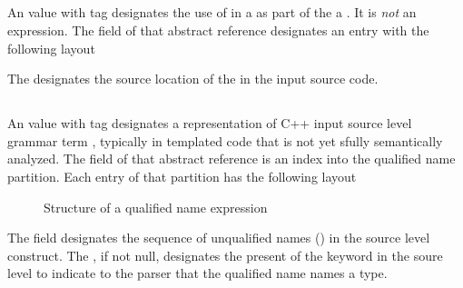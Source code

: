 


\subsection{}
\label{sec:ifc:ExprSort:Pointer}

An  value with tag  designates the use of \code{*} in a 
 as part of the a .  It is \emph{not} an expression.
The  field of that abstract reference designates an entry with the following layout
%
\begin{figure}[H]
	\centering
	\label{fig:ifc-pointer-expr-structure}
\end{figure}
%
The  designates the source location of the \code{*} in the input source code.



\subsection{}
\label{sec:ifc:ExprSort:QualifiedName}

An  value with tag  designates a representation of 
C++ input source level grammar term , typically in templated code that is not
yet sfully semantically analyzed.  The  field of that abstract reference is an index into
the qualified name partition.  Each entry of that partition has the following layout
%
\begin{figure}[H]
	\centering
	\caption{Structure of a qualified name expression}
	\label{fig:ifc-qualified-name-structure}
\end{figure}
%
The  field designates the sequence of unqualified names ()
 in the source level construct.  The , if not null, designates the present of
 the  keyword in the soure level to indicate to the parser that the qualified name names a type.

